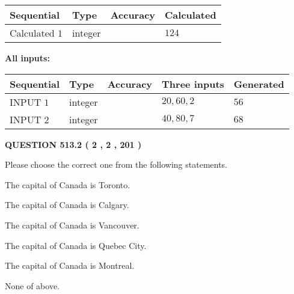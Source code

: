 \documentclass[12pt]{article}
\begin{document}
   
   
   
\noindent{}
   
   
  
  
\noindent\begin{tabular}{|l|l|l|l|}
\hline
 Sequential & Type & Accuracy & Calculated \\ 
\hline
 
 
  Calculated $  1 $ & integer &  & 
  $ 124 $ 
 \\  \hline  
 \end{tabular}
   
   
   
   
\noindent\vspace{0.1in}\hspace{-0.08in} {\textbf{\Large{All inputs: }}}
   
   
  
  
\noindent\begin{tabular}{|l|l|l|l|l|}
\hline
 Sequential & Type & Accuracy & Three inputs & Generated \\ 
\hline
 
 
  INPUT $  1 $ & integer &  & $
 20
 , 
 60
 , 
 2
 $ & $ 56 $ 
 \\  \hline  
 
 
  INPUT $  2 $ & integer &  & $
 40
 , 
 80
 , 
 7
 $ & $ 68 $ 
 \\  \hline  
 \end{tabular}
   
   
  
\vspace{0.2in}
  
{\textbf{\Large{QUESTION
513.2 
 ( 2 , 2 , 201 )
}}}
  
  
Please choose the correct one from the following statements.
 
 
The capital of Canada is Toronto.
 
 
The capital of Canada is Calgary.
 
 
The capital of Canada is Vancouver.
 
 
The capital of Canada is Quebec City.
 
 
The capital of Canada is Montreal.
 
 
 None of above.
 
 
\noindent{}
 
\end{document}
